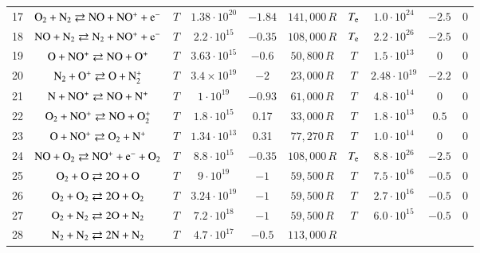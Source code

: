 \documentclass{warpdoc}
\begin{document}
\begin{table}[t]
\begin{center}
\begin{threeparttable}
\begin{tabular}{cccccccccc}
17 & $\rm O_2 + N_2 \rightleftarrows NO + NO^+ + e^-$ &$T$ & $1.38 \cdot 10^{20}$ & $-1.84$ & $141,000\, R$ 
                                         &$T_{\rm e}$ & $1.0 \cdot 10^{24}$  & $-2.5$  & 0\\
18 & $\rm NO + N_2 \rightleftarrows N_2 + NO^+ + e^-$ &$T$ & $2.2 \cdot 10^{15}$ & $-0.35$ & $108,000\, R$ 
                                          &$T_{\rm e}$ & $2.2 \cdot 10^{26}$  & $-2.5$  & 0\\
19 & $\rm O + NO^+ \rightleftarrows NO + O^+$ &$T$ & $3.63 \cdot 10^{15}$ & $-0.6$ & $50,800\, R$ 
                                          &$T$ & $1.5 \cdot 10^{13}$  & $0$  & 0\\
20 & $\rm N_2 + O^+ \rightleftarrows O + N_2^{+}$ &$T$ & $3.4 \times 10^{19}$ & $-2$ & $23,000\, R$ 
                                          &$T$ & $2.48 \cdot 10^{19}$  & $-2.2$  & 0\\
21 & $\rm N + NO^+ \rightleftarrows NO + N^+$ &$T$ & $1 \cdot 10^{19}$ & $-0.93$ & $61,000\, R$ 
                                          &$T$ & $4.8 \cdot 10^{14}$  & $0$  & 0\\
22 & $\rm O_2 + NO^+ \rightleftarrows NO + O_2^{+}$ &$T$ & $1.8 \cdot 10^{15}$ & 0.17 & $33,000\, R$ 
                                          &$T$ & $1.8 \cdot 10^{13}$  & $0.5$  & 0\\
23 & $\rm O + NO^+ \rightleftarrows O_2 + N^+$ &$T$ & $1.34 \cdot 10^{13}$ & 0.31 & $77,270\, R$ 
                                          &$T$ & $1.0 \cdot 10^{14}$  & $0$  & 0\\
24 & $\rm NO + O_2 \rightleftarrows NO^+ + e^- + O_2$ &$T$ & $8.8 \cdot 10^{15}$ & $-0.35$ & $108,000\, R$ 
                                          &$T_{\rm e}$ & $8.8 \cdot 10^{26}$  & $-2.5$  & 0\\
25 & $\rm O_2 + O \rightleftarrows 2O + O$ &$T$ & $9 \cdot 10^{19}$ & $-1$ & $59,500\, R$ 
                                          &$T$ & $7.5 \cdot 10^{16}$  & $-0.5$  & 0\\
26 & $\rm O_2 + O_2 \rightleftarrows 2O + O_2$ &$T$ & $3.24 \cdot 10^{19}$ & $-1$ & $59,500\, R$ 
                                          &$T$ & $2.7 \cdot 10^{16}$  & $-0.5$  & 0\\
27 & $\rm O_2 + N_2 \rightleftarrows 2O + N_2$ &$T$ & $7.2 \cdot 10^{18}$ & $-1$ & $59,500\, R$ 
                                          &$T$ & $6.0 \cdot 10^{15}$  & $-0.5$  & 0\\
28 & $\rm N_2 + N_2 \rightleftarrows 2N + N_2$ &$T$ & $4.7 \cdot 10^{17}$ & $-0.5$ & $113,000\, R$ 

\end{tabular}
\end{threeparttable}
\end{center}
\end{table}
\end{document}
